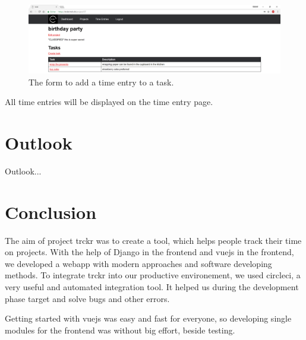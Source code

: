 \documentclass[bibliography=totoc, listof=totocnumbered]{scrartcl}
\begin{document}
\begin{figure}[h]
    \includegraphics[width=\textwidth]{trckr-project-page}
    \caption{The form to add a time entry to a task.}
    \label{fig:trckr-create-time-entry}
\end{figure}

All time entries will be displayed on the time entry page.

\section{Outlook}
Outlook...

\section{Conclusion}
The aim of project trckr was to create a tool, which helps people track their
time on projects. With the help of Django in the frontend and vuejs in the
frontend, we developed a webapp with modern approaches and software developing
methods. To integrate trckr into our productive environement, we used circleci,
a very useful and automated integration tool. It helped us during the development
phase target and solve bugs and other errors.

Getting started with vuejs was easy and fast for everyone, so developing single
modules for the frontend was without big effort, beside testing.


\clearpage
\begin{appendices}
\printbibliography
\listoffigures
\end{appendices}
\end{document}
